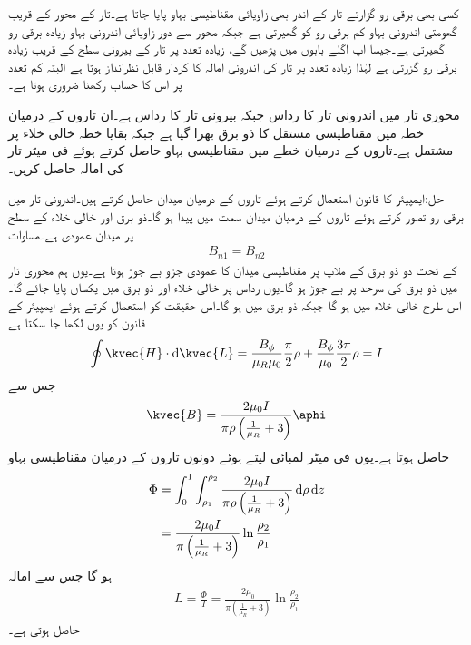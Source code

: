 کسی بھی برقی رو گزارتے تار کے اندر بھی زاویائی مقناطیسی بہاو پایا جاتا ہے۔تار کے محور کے قریب  گھومتی اندرونی بہاو کم برقی رو کو گھیرتی ہے جبکہ محور سے دور زاویائی اندرونی بہاو زیادہ برقی رو گھیرتی ہے۔جیسا آپ اگلے بابوں میں پڑھیں گے، زیادہ تعدد پر تار کے بیرونی سطح کے قریب زیادہ برقی رو گزرتی ہے لہٰذا زیادہ تعدد پر تار کی اندرونی امالہ کا کردار قابل نظرانداز ہوتا ہے البتہ کم تعدد پر اس کا حساب رکھنا ضروری ہوتا ہے۔

محوری تار میں اندرونی تار کا رداس  جبکہ بیرونی تار کا رداس  ہے۔ان تاروں کے درمیان خطہ  میں  مقناطیسی مستقل کا ذو برق بھرا گیا ہے جبکہ بقایا خطہ خالی خلاء پر مشتمل ہے۔تاروں کے درمیان خطے میں مقناطیسی بہاو حاصل کرتے ہوئے فی میٹر تار کی امالہ حاصل کریں۔

حل:ایمپیئر کا قانون استعمال کرتے ہوئے تاروں کے درمیان میدان حاصل کرتے ہیں۔اندرونی تار میں برقی رو  تصور کرتے ہوئے تاروں کے درمیان میدان  سمت میں پیدا ہو گا۔ذو برق اور خالی خلاء کے سطح پر میدان عمودی ہے۔مساوات 
\begin{align*}
B_{n1}=B_{n2}
\end{align*}
 کے تحت دو ذو برق کے ملاپ پر مقناطیسی میدان کا عمودی جزو بے جوڑ ہوتا ہے۔یوں ہم محوری تار میں ذو برق کی سرحد پر  بے جوڑ ہو گا۔یوں رداس  پر خالی خلاء اور ذو برق میں یکساں  پایا جائے گا۔اس طرح خالی خلاء میں  ہو گا جبکہ ذو برق میں  ہو گا۔اس حقیقت کو استعمال کرتے ہوئے ایمپیئر کے قانون کو یوں لکھا جا سکتا ہے
\begin{align*}
\oint \kvec{H} \cdot \dif \kvec{L}=\frac{B_{\phi}}{\mu_R \mu_0} \frac{\pi}{2} \rho+\frac{B_{\phi}}{\mu_0} \frac{3\pi}{2} \rho=I
\end{align*} 
جس سے 
\begin{align*}
\kvec{B}=\frac{2\mu_0 I}{\pi \rho \left(\frac{1}{\mu_R}+3\right)} \aphi
\end{align*}
حاصل ہوتا ہے۔یوں فی میٹر لمبائی لیتے ہوئے دونوں تاروں کے درمیان مقناطیسی بہاو
\begin{align*}
\Phi&=\int_0^{1} \int_{\rho_1}^{\rho_2} \frac{2\mu_0 I}{\pi \rho \left(\frac{1}{\mu_R}+3\right)} \dif \rho \dif z\\
&=\frac{2\mu_0 I}{\pi  \left(\frac{1}{\mu_R}+3\right)} \ln \frac{\rho_2}{\rho_1}
\end{align*}
ہو گا جس سے امالہ
\begin{align*}
L=\frac{\Phi}{I}=\frac{2\mu_0}{\pi  \left(\frac{1}{\mu_R}+3\right)} \ln \frac{\rho_2}{\rho_1}
\end{align*}
حاصل ہوتی ہے۔

